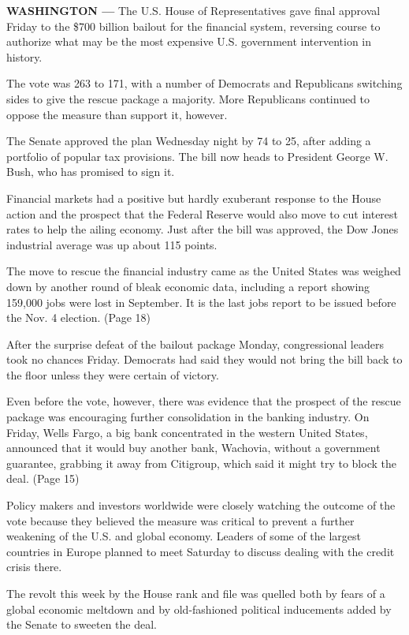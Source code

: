 \textbf{WASHINGTON ---} The U.S. House of Representatives gave final
approval Friday to the \$700 billion bailout for the financial system,
reversing course to authorize what may be the most expensive U.S.
government intervention in history.

The vote was 263 to 171, with a number of Democrats and Republicans
switching sides to give the rescue package a majority. More Republicans
continued to oppose the measure than support it, however.

The Senate approved the plan Wednesday night by 74 to 25, after adding a
portfolio of popular tax provisions. The bill now heads to President
George W. Bush, who has promised to sign it.

Financial markets had a positive but hardly exuberant response to the
House action and the prospect that the Federal Reserve would also move
to cut interest rates to help the ailing economy. Just after the bill
was approved, the Dow Jones industrial average was up about 115 points.

The move to rescue the financial industry came as the United States was
weighed down by another round of bleak economic data, including a report
showing 159,000 jobs were lost in September. It is the last jobs report
to be issued before the Nov. 4 election. (Page 18)

After the surprise defeat of the bailout package Monday, congressional
leaders took no chances Friday. Democrats had said they would not bring
the bill back to the floor unless they were certain of victory.

Even before the vote, however, there was evidence that the prospect of
the rescue package was encouraging further consolidation in the banking
industry. On Friday, Wells Fargo, a big bank concentrated in the western
United States, announced that it would buy another bank, Wachovia,
without a government guarantee, grabbing it away from Citigroup, which
said it might try to block the deal. (Page 15)

Policy makers and investors worldwide were closely watching the outcome
of the vote because they believed the measure was critical to prevent a
further weakening of the U.S. and global economy. Leaders of some of the
largest countries in Europe planned to meet Saturday to discuss dealing
with the credit crisis there.

The revolt this week by the House rank and file was quelled both by
fears of a global economic meltdown and by old-fashioned political
inducements added by the Senate to sweeten the deal.

